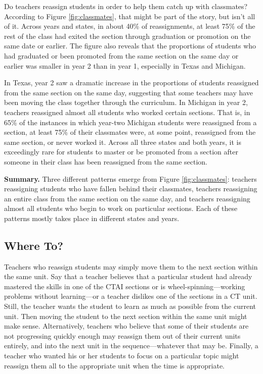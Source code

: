 \documentclass[12pt]{article}\usepackage[]{graphicx}\usepackage[]{color}
\begin{document}
Do teachers reassign students in order to help them catch up with classmates?
According to Figure \ref{fig:classmates}, that might be part of the
story, but isn't all of it.
Across years and states, in about 40\% of
reassignments, at least 75\% of the rest of the class had exited the
section through graduation or promotion on the same date or earlier.
The figure also reveals that the proportions of students who had graduated or been
promoted from the same section on the same day or earlier was smaller in year 2
than in year 1, especially in Texas and Michigan.

In Texas, year 2 saw a dramatic increase in the proportions of
students reassigned from the same section on the same day, suggesting
that some teachers may have been moving the class together through the
curriculum.
In Michigan in year 2, teachers reassigned almost all students who
worked certain sections.
That is, in 65\% of the instances in which year-two Michigan
students were reassigned from a section, at least 75\% of their
classmates were, at some point, reassigned from the same section, or
never worked it.
Across all three states and both years, it is exceedingly rare for
students to master or be promoted from a section after someone in
their class has been reassigned from the same section.

\textbf{Summary.} Three different patterns emerge from Figure
\ref{fig:classmates}: teachers reassigning students who have fallen
behind their classmates, teachers reassigning an entire class from the
same section on the same day, and teachers reassigning almost all
students who begin to work on particular sections.
Each of these patterns mostly takes place in different states and
years.

\subsection{Where To?}

Teachers who reassign students may simply move them to the next
section within the same unit.
Say that a teacher believes that a particular student had already mastered
the skills in one of the CTAI sections or is wheel-spinning---working
problems without learning---or a teacher dislikes one of the sections in a CT unit.
Still, the teacher wants the student to learn as much as possible from
the current unit.
Then moving the student to the next section within the same unit might
make sense.
Alternatively, teachers who believe that some of their students are
not progressing quickly enough may reassign them out of their current
units entirely, and into the next unit in the sequence---whatever that
may be.
Finally, a teacher who wanted his or her students to focus on a
particular topic might reassign them all to the appropriate unit
when the time is appropriate.
\end{document}
